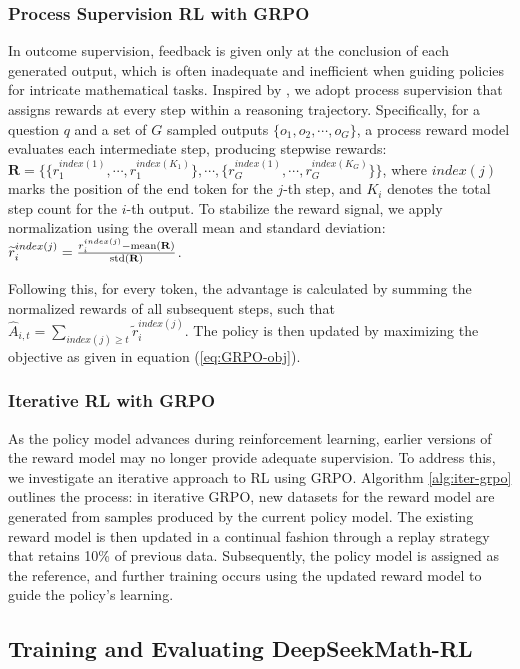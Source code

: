 \begin{itemize}[topsep=0pt]
\begin{itemize}[topsep=0pt]
\subsubsection{Process Supervision RL with GRPO}  
In outcome supervision, feedback is given only at the conclusion of each generated output, which is often inadequate and inefficient when guiding policies for intricate mathematical tasks. Inspired by \cite{wang2023math}, we adopt process supervision that assigns rewards at every step within a reasoning trajectory. Specifically, for a question $q$ and a set of $G$ sampled outputs $\{o_1, o_2, \cdots, o_G\}$, a process reward model evaluates each intermediate step, producing stepwise rewards: $\mathbf{R} = \{ \{r_1^{index(1)},\cdots,r_1^{index(K_1)}\}, \cdots,  \{r_G^{index(1)},\cdots,r_G^{index(K_G)}\} \}$, where $index(j)$ marks the position of the end token for the $j$-th step, and $K_i$ denotes the total step count for the $i$-th output. To stabilize the reward signal, we apply normalization using the overall mean and standard deviation: $\widetilde{r}_i^{index(j)} = \frac{r_i^{index(j)} - {\rm mean(\mathbf{R})}}{{\rm std(\mathbf{R})}}$.

Following this, for every token, the advantage is calculated by summing the normalized rewards of all subsequent steps, such that $\hat{A}_{i, t} = \sum_{index(j) \ge t} \widetilde{r}_i^{index(j)}$. The policy is then updated by maximizing the objective as given in equation (\ref{eq:GRPO-obj}).

\subsubsection{Iterative RL with GRPO} As the policy model advances during reinforcement learning, earlier versions of the reward model may no longer provide adequate supervision. To address this, we investigate an iterative approach to RL using GRPO. Algorithm \ref{alg:iter-grpo} outlines the process: in iterative GRPO, new datasets for the reward model are generated from samples produced by the current policy model. The existing reward model is then updated in a continual fashion through a replay strategy that retains 10\% of previous data. Subsequently, the policy model is assigned as the reference, and further training occurs using the updated reward model to guide the policy's learning.

\subsection{Training and Evaluating DeepSeekMath-RL}


\end{itemize}
\end{itemize}
